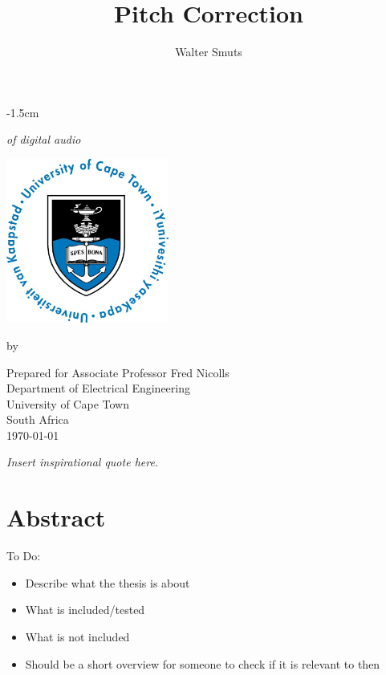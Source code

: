 \documentclass[12pt, twoside, openright]{report}
\title{Pitch Correction}
\author{Walter Smuts}
\makeatletter
\def\cleardoublepage{\clearpage\if@twoside \ifodd\c@page\else
\hbox{}
\vspace*{\fill}
\begin{center}
	\it Insert inspirational quote here.
\end{center}
\vspace{\fill}
\thispagestyle{empty}
\newpage
\if@twocolumn\hbox{}\newpage\fi\fi\fi}
\makeatother
\begin{document}
\makeatletter
\let\TITLE\@title
\makeatother

\begin{titlepage}
\begin{adjustwidth*}{}{-1.5cm} %
\begin{center}
	\vspace*{4cm}

	{\Huge\textbf\thetitle}

	{\it of digital audio}

	\vspace{0.8cm}
	\includegraphics[width=0.4\textwidth]{UCT.jpg}
	\vspace{0.8cm}


	by \theauthor
	\vspace{0.8cm}

	Prepared for Associate Professor Fred Nicolls\\
	Department of Electrical Engineering\\
	University of Cape Town\\
	South Africa\\
	\vspace{2cm}
	\today
\end{center}
\end{adjustwidth*}
\end{titlepage}
\cleardoublepage

\setcounter{page}{1}

\section*{Abstract}

{\color{red}
To Do:
\begin{itemize}
	\item Describe what the thesis is about
	\item What is included/tested
	\item What is not included
	\item Should be a short overview for someone to check if it is relevant
	to then
	\end{itemize}
\color{black}
}
\end{document}
